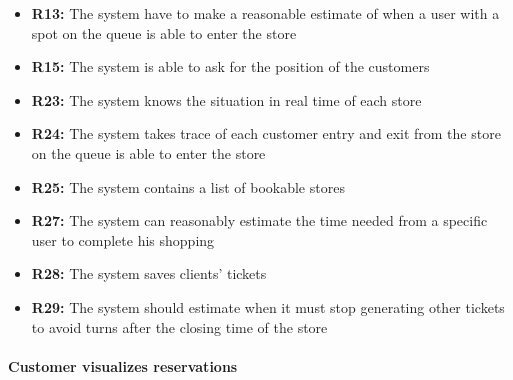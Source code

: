 \documentclass{article}
\begin{document}
\begin{center}
\begin{itemize}
					\item {\bfseries R13: } The system have to make a reasonable estimate of when a user with a spot
on the queue is able to enter the store
					\item {\bfseries R15: } The system is able to ask for the position of the customers
					\item {\bfseries R23: } The system knows the situation in real time of each store

					\item {\bfseries R24: } The system takes trace of each customer entry and exit from the store
on the queue is able to enter the store
					\item {\bfseries R25: } The system contains a list of bookable stores
					\item {\bfseries R27: } The system can reasonably estimate the time needed from a specific user
to complete his shopping

					\item {\bfseries R28: } The system saves clients' tickets
					\item {\bfseries R29: } The system should estimate when it must stop generating other tickets to
avoid turns after the closing time of the store

					\end{itemize}
				\end{center}
			
			\paragraph{Customer visualizes reservations}
			
\end{document}
